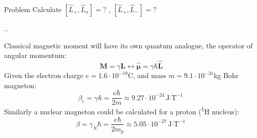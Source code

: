 \documentclass{beamer}
\begin{document}
\begin{frame}
		\begin{block}{Problem}
			Calculate $[\hat{L}_{+}, \hat{L}_x ] = ?$ , $[\hat{L}_{+}, \hat{L}_{-} ] = ?$ 
		\end{block}



\end{frame}




\begin{frame}{\thesection.\thesubsection. \insertsubsection}

		
			Classical magnetic moment will have its own quantum analogue, the operator of angular momentum:
			\begin{equation}\label{eq:orbital_angular_momentum}
			\bm{M} = \gamma \bm{L}  \longleftrightarrow \bm{\hat{\mu}} = \gamma \hbar \bm{\hat{L}}
			\end{equation} 
		\onslide<2-> Given the electron charge $e= 1.6 \cdot 10^{-19}$C, and mass $m = 9.1 \cdot 10^{-31}$kg   \alert{Bohr magneton}:
		\begin{equation}
			\beta_e = \gamma \hbar = \dfrac{e\hbar}{2m} \approx 9.27 \cdot 10^{-24}  \text{J$\cdot$T}^{-1}
		\end{equation}
		\onslide<3-> Similarly a \alert{nuclear magneton} could be calculated for a proton (\textsuperscript{1}H nucleus):
		\begin{equation}
		\beta = \gamma_N \hbar = \dfrac{e\hbar}{2m_p} \approx 5.05 \cdot 10^{-27}  \text{J$\cdot$T}^{-1}
		\end{equation}
		


\end{frame}
\end{document}
